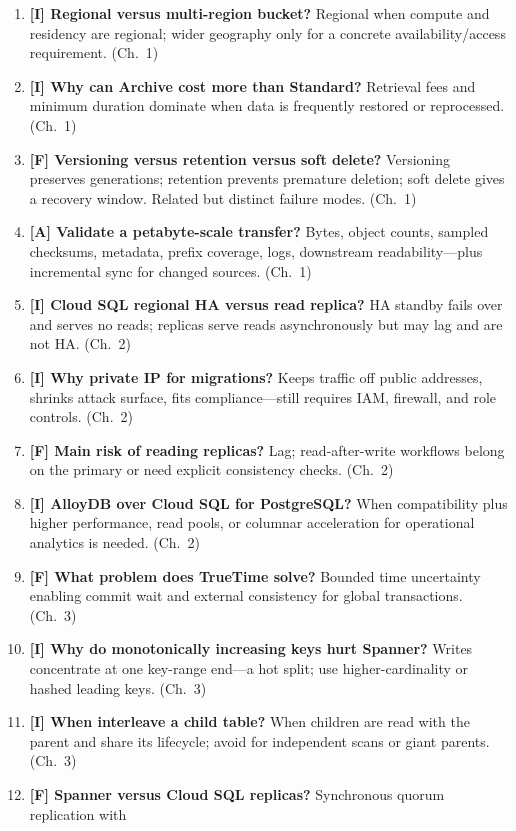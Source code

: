 \begin{enumerate}
    \item \textbf{[I] Regional versus multi-region bucket?} Regional when compute and residency
    are regional; wider geography only for a concrete availability/access requirement. (Ch.~1)
    \item \textbf{[I] Why can Archive cost more than Standard?} Retrieval fees and minimum
    duration dominate when data is frequently restored or reprocessed. (Ch.~1)
    \item \textbf{[F] Versioning versus retention versus soft delete?} Versioning preserves
    generations; retention prevents premature deletion; soft delete gives a recovery window.
    Related but distinct failure modes. (Ch.~1)
    \item \textbf{[A] Validate a petabyte-scale transfer?} Bytes, object counts, sampled checksums,
    metadata, prefix coverage, logs, downstream readability---plus incremental sync for changed
    sources. (Ch.~1)
    \item \textbf{[I] Cloud SQL regional HA versus read replica?} HA standby fails over and serves
    no reads; replicas serve reads asynchronously but may lag and are not HA. (Ch.~2)
    \item \textbf{[I] Why private IP for migrations?} Keeps traffic off public addresses, shrinks
    attack surface, fits compliance---still requires IAM, firewall, and role controls. (Ch.~2)
    \item \textbf{[F] Main risk of reading replicas?} Lag; read-after-write workflows belong on
    the primary or need explicit consistency checks. (Ch.~2)
    \item \textbf{[I] AlloyDB over Cloud SQL for PostgreSQL?} When compatibility plus higher
    performance, read pools, or columnar acceleration for operational analytics is needed. (Ch.~2)
    \item \textbf{[F] What problem does TrueTime solve?} Bounded time uncertainty enabling commit
    wait and external consistency for global transactions. (Ch.~3)
    \item \textbf{[I] Why do monotonically increasing keys hurt Spanner?} Writes concentrate at
    one key-range end---a hot split; use higher-cardinality or hashed leading keys. (Ch.~3)
    \item \textbf{[I] When interleave a child table?} When children are read with the parent and
    share its lifecycle; avoid for independent scans or giant parents. (Ch.~3)
    \item \textbf{[F] Spanner versus Cloud SQL replicas?} Synchronous quorum replication with

\end{enumerate}
